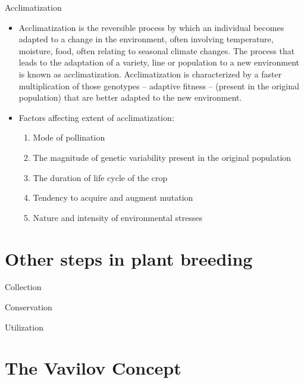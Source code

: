 \documentclass[11pt,ignorenonframetext,aspectratio=169]{beamer}
\providecommand{\tightlist}{%
  \setlength{\itemsep}{0pt}\setlength{\parskip}{0pt}}
\begin{document}
\begin{frame}{Acclimatization}
\protect\hypertarget{acclimatization}{}
\begin{itemize}
\item
  Acclimatization is the reversible process by which an individual
  becomes adapted to a change in the environment, often involving
  temperature, moisture, food, often relating to seasonal climate
  changes. The process that leads to the adaptation of a variety, line
  or population to a new environment is known as acclimatization.
  Acclimatization is characterized by a faster multiplication of those
  genotypes -- adaptive fitness -- (present in the original population)
  that are better adapted to the new environment.
\item
  Factors affecting extent of acclimatization:

  \begin{enumerate}
  \tightlist
  \item
    Mode of pollination
  \item
    The magnitude of genetic variability present in the original
    population
  \item
    The duration of life cycle of the crop
  \item
    Tendency to acquire and augment mutation
  \item
    Nature and intensity of environmental stresses
  \end{enumerate}
\end{itemize}
\end{frame}

\hypertarget{other-steps-in-plant-breeding}{%
\section{Other steps in plant
breeding}\label{other-steps-in-plant-breeding}}

\begin{frame}{Collection}
\protect\hypertarget{collection}{}
\end{frame}

\begin{frame}{Conservation}
\protect\hypertarget{conservation}{}
\end{frame}

\begin{frame}{Utilization}
\protect\hypertarget{utilization}{}
\end{frame}

\hypertarget{the-vavilov-concept}{%
\section{The Vavilov Concept}\label{the-vavilov-concept}}
\end{document}
